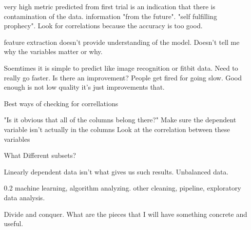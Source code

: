 

very high metric predicted from first trial is
an indication that there is contamination of the
data. 
information "from the future". "self fulfilling prophecy".
Look for correlations because the accuracy is too good.

feature extraction doesn't provide understanding of the model.
Doesn't tell me why the variables matter or why.

Soemtimes it is simple to predict like image recognition
or fitbit data.
Need to really go faster. Is there an improvement?
People get fired for going slow. 
Good enough is not low quality it's just improvements
that.

Best ways of checking for correllations

"Is it obvious that all of the columns belong there?"
Make sure the dependent variable isn't actually in the columns
Look at the correlation between these variables 

What Different subsets? 

Linearly dependent data isn't what gives us such results.
Unbalanced data.

0.2 machine learning, algorithm analyzing.
other cleaning, pipeline, exploratory data analysis. 

Divide and conquer.
What are the pieces that I will have something concrete
and useful.


